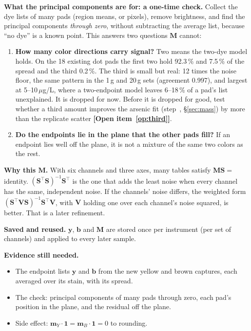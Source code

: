 \documentclass[11pt,letter]{article}
\makeatletter
\newcommand{\open}[1]{\textbf{[Open item~\ref{#1}]}}
\newcommand{\one}{\mathbf{1}}
\newcommand{\vy}{\mathbf{y}}
\newcommand{\vb}{\mathbf{b}}
\newcommand{\mS}{\mathbf{S}}
\newcommand{\mM}{\mathbf{M}}
\newcommand{\vm}{\mathbf{m}}
\newcommand{\sno}[1]{step~\@nameuse{stepno@#1}}
\newcommand{\psref}[1]{\sno{#1}, \S\ref{#1}}  %
\newenvironment{evidence}{\par\medskip\noindent\textbf{Evidence still
needed.}\begin{itemize}[nosep]}{\end{itemize}\medskip}
\makeatother
\begin{document}
\textbf{What the principal components are for: a one-time check.}  Collect
the dye lists of many pads (region means, or pixels), remove brightness,
and find the principal components \emph{through zero}, without
subtracting the average list, because ``no dye'' is a known point.  This
answers two questions $\mM$ cannot:
\begin{enumerate}[nosep]
  \item \textbf{How many color directions carry signal?}  Two means the
    two-dye model holds.  On the 18 existing dot pads the first two hold
    92.3\,\% and 7.5\,\% of the spread and the third 0.2\,\%.  The third is
    small but real: 12 times the noise floor, the same pattern in the 1\,g
    and 20\,g sets (agreement 0.997), and largest at 5--10\,$\mu$g/L, where
    a two-endpoint model leaves 6--18\,\% of a pad's list unexplained.  It is
    dropped for now.  Before it is dropped for good, test whether a third
    amount improves the arsenic fit (\psref{sec:mass}) by more than the
    replicate scatter \open{op:third}.
  \item \textbf{Do the endpoints lie in the plane that the other pads
    fill?}  If an endpoint lies well off the plane, it is not a mixture of
    the same two colors as the rest.
\end{enumerate}

\textbf{Why this $\mM$.}  With six channels and three axes, many tables
satisfy $\mM\mS = $ identity.  $(\mS^\top\mS)^{-1}\mS^\top$ is the one that
adds the least noise when every channel has the same, independent noise.
If the channels' noise differs, the weighted form
$(\mS^\top\mathbf{V}\mS)^{-1}\mS^\top\mathbf{V}$, with $\mathbf{V}$ holding
one over each channel's noise squared, is better.  That is a later
refinement.

\textbf{Saved and reused.}  $\vy$, $\vb$ and $\mM$ are stored once per
instrument (per set of channels) and applied to every later sample.

\begin{evidence}
  \item The endpoint lists $\vy$ and $\vb$ from the new yellow and brown
    captures, each averaged over its stain, with its spread.
  \item The check: principal components of many pads through zero, each
    pad's position in the plane, and the residual off the plane.
  \item Side effect: $\vm_Y \cdot \one = \vm_B \cdot \one = 0$ to rounding.
\end{evidence}
\end{document}
